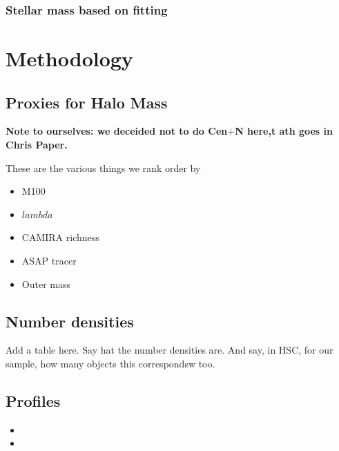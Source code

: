 \documentclass[a4paper,fleqn,usenatbib]{mnras}
\begin{document}
\subsubsection{Stellar mass based on \ser{} fitting}
	\label{sec:mser}

\section{Methodology}

\subsection{Proxies for Halo Mass}

\textbf{Note to ourselves: we deceided not to do Cen$+$N here,t ath goes in Chris Paper.}

These are the various things we rank order by

\begin{itemize}
    \item M100
    \item $lambda$
    \item CAMIRA richness
    \item ASAP tracer
    \item Outer mass
\end{itemize}

\subsection{Number densities}

Add a table here. Say hat the number densities are. And say, in HSC, for our sample, how many objects this correspondsw too.
    
\subsection{\dsigma{} Profiles}
    \label{sec:dsigma}   
    
    

	\begin{itemize}
		
		\item {}
		
		\item {}
		
	\end{itemize}    
	   
\end{document}
